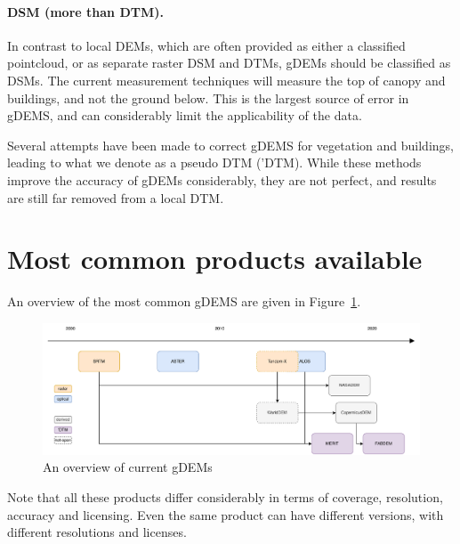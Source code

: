 



\paragraph{DSM (more than DTM).}
In contrast to local DEMs, which are often provided as either a classified pointcloud, or as separate raster DSM and DTMs, gDEMs should be classified as DSMs.
The current measurement techniques will measure the top of canopy and buildings, and not the ground below.
This is the largest source of error in gDEMS, and can considerably limit the applicability of the data.

Several attempts have been made to correct gDEMS for vegetation and buildings, leading to what we denote as a pseudo DTM ('DTM).
While these methods improve the accuracy of gDEMs considerably, they are not perfect, and results are still far removed from a local DTM\@.

%
\section[Most common products]{Most common products available}

An overview of the most common gDEMS are given in Figure~\ref{fig:gdem_inheritance}.
\begin{figure} %
  \centering
  \includegraphics[width=\linewidth]{dems_overview}
  \caption{An overview of current gDEMs}%
\label{fig:gdem_inheritance}
\end{figure}
Note that all these products differ considerably in terms of coverage, resolution, accuracy and licensing.
Even the same product can have different versions, with different resolutions and licenses.

